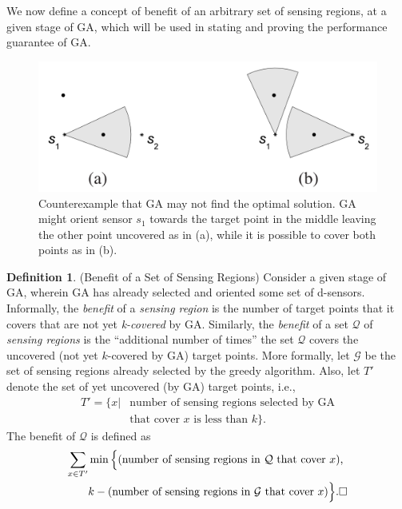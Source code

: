 \documentclass[conference]{IEEEtran}
\theoremstyle{definition}
\newtheorem{definition}{Definition}
\newtheorem*{NP-Hardness of Approximating the SODkC Problem}{NP-Hardness of Approximating the SODkC Problem}
\newtheorem*{Greedy Algorithm (GA)}{Greedy Algorithm (GA)}
\newtheorem*{GA on the Running Example}{GA on the Running Example}
\newtheorem*{Performance Guarantee of GA}{Performance Guarantee of GA}
\begin{document}
We now define a concept of benefit of an arbitrary set of sensing regions, at a given stage of GA, which will be used in stating and proving the performance guarantee of GA.

\begin{figure}
    \centering
    \includegraphics[width=0.8\columnwidth]{3.png}
    \caption{Counterexample that GA may not find the optimal solution. GA might orient sensor $s_1$ towards the target point in the middle leaving the other point uncovered as in (a), while it is possible to
cover both points as in (b).}
    \label{fig:enter-label}
\end{figure}

\begin{definition}
(Benefit of a Set of Sensing Regions) Consider a given stage of GA, wherein GA has already selected and oriented some set of d-sensors. Informally, the \textit{benefit} of a \textit{sensing region} is the number of target points that it covers that are not yet \textit{k-covered} by GA. Similarly, the \textit{benefit} of a set $\mathcal{Q}$ of \textit{sensing regions} is the “additional number of times” the set $\mathcal{Q}$ covers the uncovered (not yet $k$-covered by GA) target points. More formally, let $\mathcal{G}$ be the set of sensing regions already selected by the greedy algorithm. Also, let $T'$ denote the set of yet uncovered (by GA) target points, i.e.,
\begin{equation*}
    \begin{split}
        T' = \{x | &\text{number of sensing regions selected by GA} \\
        &\text{that cover $x$ is less than $k$} \}. 
    \end{split}
\end{equation*}
The benefit of $\mathcal{Q}$ is defined as
\begin{equation*}
    \begin{split}
        \sum_{x \in T'} &\min \Big \{ (\text{number of sensing regions in $\mathcal{Q}$ that cover $x$),} \\
        & k - \text{(number of sensing regions in $\mathcal{G}$ that cover $x$}) \Big \}.\hfill\square
    \end{split}
\end{equation*}
\end{definition}
\end{document}
